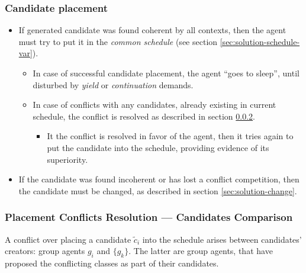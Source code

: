 \documentclass[../../ThesisDoc]{subfiles}
\begin{document}

\bigskip
{}

\subsubsection{Candidate placement}
\begin{itemize}
  \item If generated candidate was found coherent by all contexts,
        then the agent must try to put it in the \emph{common schedule}
        (see section \ref{sec:solution-schedule-var}).
        \begin{itemize}
          \item In case of successful candidate placement, the agent ``goes to sleep'',
                until disturbed by \emph{yield} or \emph{continuation} demands.
          \item In case of conflicts with any candidates, already existing
                in current schedule, the conflict is resolved as described
                in section \ref{sec:solution-compare}.
                \begin{itemize}
                  \item It the conflict is resolved in favor of the agent,
                        then it tries again to put the candidate into the
                        schedule, providing evidence of its superiority.
                \end{itemize}
        \end{itemize}
  \item If the candidate was found incoherent or has lost a conflict competition,
        then the candidate must be changed, as described in section
        \ref{sec:solution-change}.
\end{itemize}



\subsubsection{Placement Conflicts Resolution --- Candidates Comparison}
\label{sec:solution-compare}

A conflict over placing a candidate $\tilde{c}_i$ into the schedule arises
between candidates' creators: group agents $g_i$ and $\{g_k\}$.
The latter are group agents, that have proposed the conflicting classes
as part of their candidates.
\end{document}
